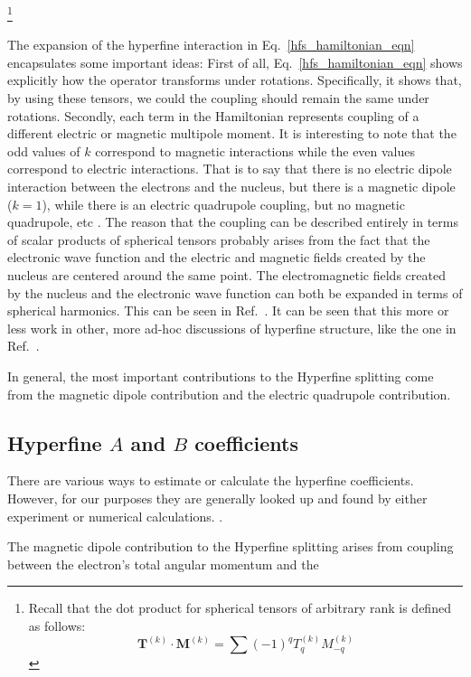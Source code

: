\footnote{Recall that the dot product for spherical tensors of arbitrary rank is defined as follows:
\begin{equation}
\mathbf{T}^{(k)}\cdot\mathbf{M}^{(k)}=\sum (-1)^qT_q^{(k)}M_{-q}^{(k)}
\end{equation}
}

The expansion of the hyperfine interaction in Eq.\ \ref{hfs_hamiltonian_eqn} encapsulates some important ideas:
 First of all, Eq.\ \ref{hfs_hamiltonian_eqn} shows explicitly how the operator transforms under rotations. Specifically, it shows that, by using these tensors, we could the coupling should remain the same under rotations.
Secondly, each term in the Hamiltonian represents coupling of a different electric or magnetic multipole moment. 
It is interesting to note that the odd values of $k$ correspond to magnetic interactions while the even values correspond to electric interactions. That is to say that there is no electric dipole interaction between the electrons and the nucleus, but there is a magnetic dipole ($k=1$), while there is an electric quadrupole coupling, but no magnetic quadrupole, etc
\cite{experimental_hyperfine_alkali_arimondo}
.
The reason that the coupling can be described entirely in terms of scalar products of spherical tensors probably arises from the fact that the electronic wave function and the electric and magnetic fields created by the nucleus are centered around the same point. The electromagnetic fields created by the nucleus and the electronic wave function can both be expanded in terms of spherical harmonics. This can be seen in Ref.\ \cite{schwartz_hyperfine_expansion}. It can be seen that this more or less work in other, more ad-hoc discussions of hyperfine structure, like the one in Ref.\ \cite{cuaMITnotes}. 

In general, the most important contributions to the Hyperfine splitting come from the magnetic dipole contribution and the electric quadrupole contribution. 


\subsection{Hyperfine $A$ and $B$ coefficients}
There are various ways to estimate or calculate the hyperfine coefficients. However, for our purposes they are generally looked up and found by either experiment or numerical calculations. \cite{cuaMITnotes}. 


The magnetic dipole contribution to the Hyperfine splitting arises from coupling between the electron's total angular momentum and the 



